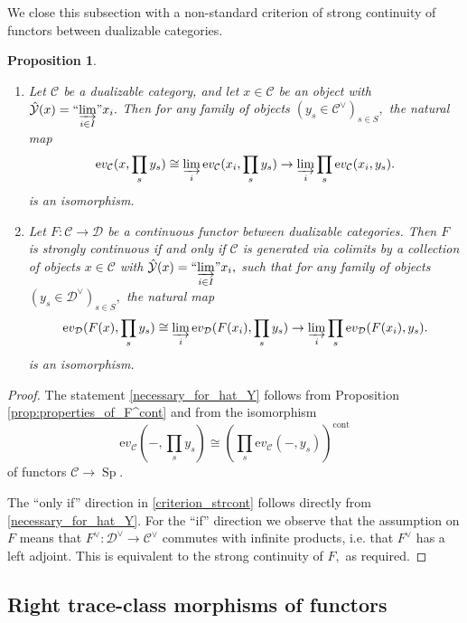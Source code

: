 \documentclass[11pt,leqno]{amsart}
\newtheorem{prop}[theo]{Proposition}
\numberwithin{equation}{section}
\newcommand{\indlim}[1][]{\mathop{\varinjlim}\limits_{#1}}
\newcommand{\inddlim}[1][]{{``{\indlim[#1]}"}}
\newcommand{\prodd}[1][]{\mathop{\prod}\limits_{#1}}
\newcommand{\cont}{\operatorname{cont}}
\newcommand{\ev}{\mathrm ev}
\newcommand{\cD}{{\mathcal D}}
\newcommand{\cC}{{\mathcal C}}
\newcommand{\cY}{{\mathcal Y}}
\newcommand{\Sp}{\operatorname{Sp}}
\begin{document}
We close this subsection with a non-standard criterion of strong continuity of functors between dualizable categories.

\begin{prop}\label{prop:criterion_strcont}
	\begin{enumerate}[label=(\roman*), ref=(\roman*)]
		\item Let $\cC$ be a dualizable category, and let $x\in\cC$ be an object with $\hat{\cY}(x)=\inddlim[i\in I]x_i.$ Then for any family of objects $(y_s\in\cC^{\vee})_{s\in S},$ the natural map 
		\begin{equation*}\label{eq:comparison_for_products}
			\ev_{\cC}(x,\prodd[s]y_s)\cong\indlim[i]\ev_{\cC}(x_i,\prodd[s]y_s)\to\indlim[i]\prodd[s]\ev_{\cC}(x_i,y_s).
		\end{equation*}
		is an isomorphism. \label{necessary_for_hat_Y}
		\item Let $F:\cC\to\cD$ be a continuous functor between dualizable categories. Then $F$ is strongly continuous if and only if $\cC$ is generated via colimits by a collection of objects $x\in\cC$ with $\hat{\cY}(x)=\inddlim[i\in I]x_i,$ such that for any family of objects $(y_s\in\cD^{\vee})_{s\in S},$ the natural map
		\begin{equation*}
			\ev_{\cD}(F(x),\prodd[s]y_s)\cong\indlim[i]\ev_{\cD}(F(x_i),\prodd[s]y_s)\to\indlim[i]\prodd[s]\ev_{\cD}(F(x_i),y_s).
		\end{equation*}
		is an isomorphism. \label{criterion_strcont}
	\end{enumerate}
\end{prop}

\begin{proof}
	The statement \ref{necessary_for_hat_Y} follows from Proposition \ref{prop:properties_of_F^cont} and from the isomorphism $$\ev_{\cC}(-,\prodd[s]y_s)\cong (\prodd[s]\ev_{\cC}(-,y_s))^{\cont}$$ of functors $\cC\to\Sp.$ 
	
	The ``only if'' direction in \ref{criterion_strcont} follows directly from \ref{necessary_for_hat_Y}. For the ``if'' direction we observe that the assumption on $F$ means that $F^{\vee}:\cD^{\vee}\to\cC^{\vee}$ commutes with infinite products, i.e. that $F^{\vee}$ has a left adjoint. This is equivalent to the strong continuity of $F,$ as required.
\end{proof}

\subsection{Right trace-class morphisms of functors}
\end{document}
